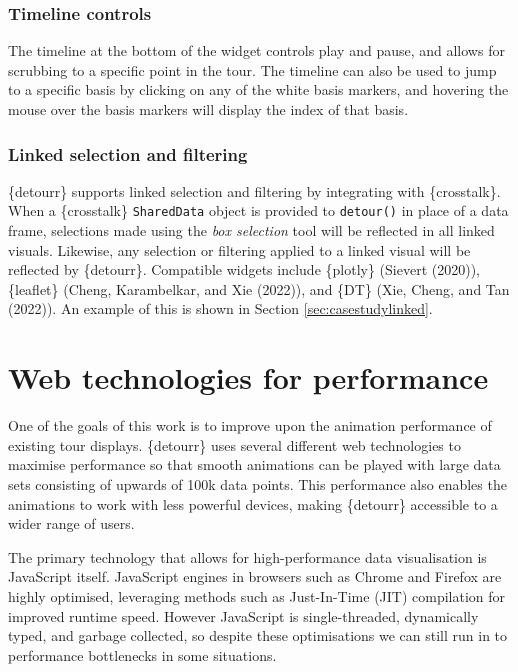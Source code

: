 \hypertarget{timeline-controls}{%
\subsubsection{Timeline controls}\label{timeline-controls}}

The timeline at the bottom of the widget controls play and pause, and allows for scrubbing to a specific point in the tour. The timeline can also be used to jump to a specific basis by clicking on any of the white basis markers, and hovering the mouse over the basis markers will display the index of that basis.

\hypertarget{linked-selection-and-filtering}{%
\subsubsection{Linked selection and filtering}\label{linked-selection-and-filtering}}

\{detourr\} supports linked selection and filtering by integrating with \{crosstalk\}. When a \{crosstalk\} \texttt{SharedData} object is provided to \texttt{detour()} in place of a data frame, selections made using the \emph{box selection} tool will be reflected in all linked visuals. Likewise, any selection or filtering applied to a linked visual will be reflected by \{detourr\}. Compatible widgets include \{plotly\} (Sievert (2020)), \{leaflet\} (Cheng, Karambelkar, and Xie (2022)), and \{DT\} (Xie, Cheng, and Tan (2022)). An example of this is shown in Section \ref{sec:casestudylinked}.

\pagebreak

\hypertarget{ch:webtechnologies}{%
\section{Web technologies for performance}\label{ch:webtechnologies}}

One of the goals of this work is to improve upon the animation performance of existing tour displays. \{detourr\} uses several different web technologies to maximise performance so that smooth animations can be played with large data sets consisting of upwards of 100k data points. This performance also enables the animations to work with less powerful devices, making \{detourr\} accessible to a wider range of users.

The primary technology that allows for high-performance data visualisation is JavaScript itself. JavaScript engines in browsers such as Chrome and Firefox are highly optimised, leveraging methods such as Just-In-Time (JIT) compilation for improved runtime speed. However JavaScript is single-threaded, dynamically typed, and garbage collected, so despite these optimisations we can still run in to performance bottlenecks in some situations.


